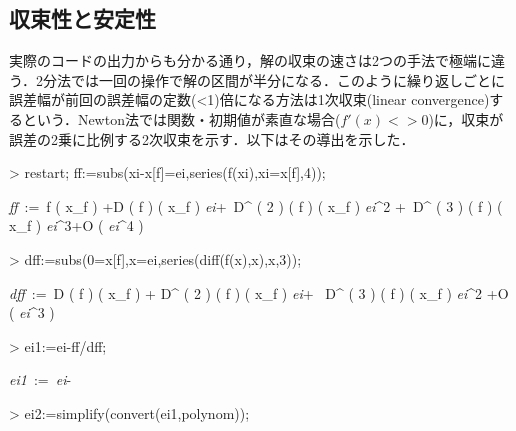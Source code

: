 \subsection{収束性と安定性}
実際のコードの出力からも分かる通り，解の収束の速さは2つの手法で極端に違う．2分法では一回の操作で解の区間が半分になる．このように繰り返しごとに誤差幅が前回の誤差幅の定数(<1)倍になる方法は1次収束(linear convergence)するという．Newton法では関数・初期値が素直な場合($f'(x) <> 0$)に，収束が誤差の2乗に比例する2次収束を示す．以下はその導出を示した．

\begin{MapleInput}
> restart; ff:=subs(xi-x[f]=ei,series(f(xi),xi=x[f],4));
\end{MapleInput}
\begin{MapleOutput}
{\it ff}\, := \,f \left( x_{{f}} \right) +D \left( f \right)  \left( x_{{f}} \right) {\it ei}+\,  D^{ \left( 2 \right) }   \left( f \right)  \left( x_{{f}} \right) {{\it ei}}^{2} +\, 
D^{ \left( 3 \right) }   \left( f \right)  \left( x_{{f}} \right) {{\it ei}}^{3}+O \left( {{\it ei}}^{4} \right)
\end{MapleOutput}
\begin{MapleInput}
> dff:=subs({0=x[f],x=ei},series(diff(f(x),x),x,3));
\end{MapleInput}
\begin{MapleOutput}
{\it dff}\, := \,D \left( f \right)  \left( x_{{f}} \right) + 
D^{ \left( 2 \right) } \left( f \right)  \left( x_{{f}} \right) {\it ei}+
\, D^{ \left( 3 \right) } \left( f \right)  \left( x_{{f}} \right) {{\it ei}}^{2} +O \left( {{\it ei}}^{3} \right)
\end{MapleOutput}
\begin{MapleInput}
> ei1:=ei-ff/dff;
\end{MapleInput}
\begin{MapleOutput}
{\it ei1}\, := \,{\it ei}-{}
\end{MapleOutput}
\begin{MapleInput}
> ei2:=simplify(convert(ei1,polynom));
\end{MapleInput}
